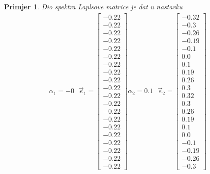 \documentclass[11pt]{article}
\newtheorem{example}{Primjer}
\begin{document}
\begin{example}
            Dio spektra Laplsove matrice je dat u nastavku
            \[
                \begin{split}
                    \alpha_1=-0   \text{  } \vec{e}_1 = \begin{bmatrix} -0.22 \\ -0.22 \\ -0.22 \\ -0.22 \\ -0.22 \\ -0.22 \\ -0.22 \\ -0.22 \\ -0.22 \\ -0.22 \\ -0.22 \\ -0.22 \\ -0.22 \\ -0.22 \\ -0.22 \\ -0.22 \\ -0.22 \\ -0.22 \\ -0.22 \\ -0.22 \end{bmatrix}  
                    \alpha_2=0.1  \text{  } \vec{e}_2 = \begin{bmatrix} -0.32 \\ -0.3 \\ -0.26 \\ -0.19 \\ -0.1 \\ 0.0 \\ 0.1 \\ 0.19 \\ 0.26 \\ 0.3 \\ 0.32 \\ 0.3 \\ 0.26 \\ 0.19 \\ 0.1 \\ 0.0 \\ -0.1 \\ -0.19 \\ -0.26 \\ -0.3 \end{bmatrix} 

\end{split}\]
\end{example}
\end{document}
